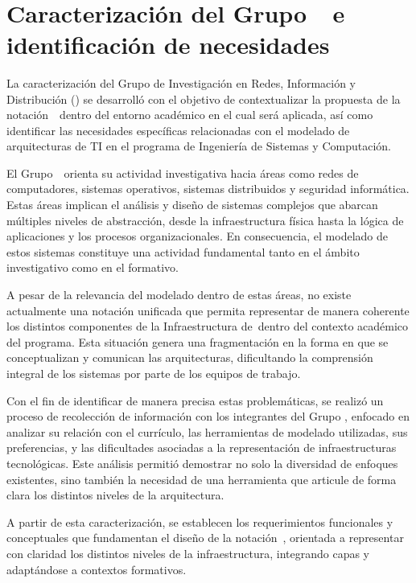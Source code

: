 \label{cap:resultados}
\mbox{}\\

\section{Caracterización del Grupo~\GRID~e identificación de necesidades}
\noindent

La caracterización del Grupo de Investigación en Redes, Información y Distribución (\GRID) se desarrolló con el objetivo de contextualizar la propuesta de la notación~\NDITI~dentro del entorno académico en el cual será aplicada, así como identificar las necesidades específicas relacionadas con el modelado de arquitecturas de TI en el programa de Ingeniería de Sistemas y Computación.

El Grupo~\GRID~orienta su actividad investigativa hacia áreas como redes de computadores, sistemas operativos, sistemas distribuidos y seguridad informática. Estas áreas implican el análisis y diseño de sistemas complejos que abarcan múltiples niveles de abstracción, desde la infraestructura física hasta la lógica de aplicaciones y los procesos organizacionales. En consecuencia, el modelado de estos sistemas constituye una actividad fundamental tanto en el ámbito investigativo como en el formativo.

A pesar de la relevancia del modelado dentro de estas áreas, no existe actualmente una notación unificada que permita representar de manera coherente los distintos componentes de la Infraestructura de~\TI dentro del contexto académico del programa. Esta situación genera una fragmentación en la forma en que se conceptualizan y comunican las arquitecturas, dificultando la comprensión integral de los sistemas por parte de los equipos de trabajo.

Con el fin de identificar de manera precisa estas problemáticas, se realizó un proceso de recolección de información con los integrantes del Grupo \GRID, enfocado en analizar su relación con el currículo, las herramientas de modelado utilizadas, sus preferencias, y las dificultades asociadas a la representación de infraestructuras tecnológicas. Este análisis permitió demostrar no solo la diversidad de enfoques existentes, sino también la necesidad de una herramienta que articule de forma clara los distintos niveles de la arquitectura.

A partir de esta caracterización, se establecen los requerimientos funcionales y conceptuales que fundamentan el diseño de la notación~\NDITI{}, orientada a representar con claridad los distintos niveles de la infraestructura, integrando capas y adaptándose a contextos formativos.

